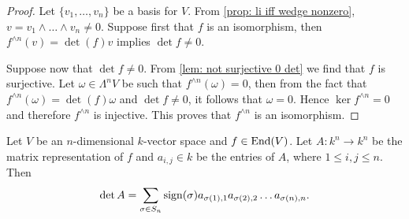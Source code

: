 \begin{proof}
Let \(\{v_1, \dots, v_n\}\) be a basis for \(V\). From \cref{prop: li iff
wedge nonzero}, \(v = v_1 \wedge \dots \wedge v_n \neq 0\).  Suppose first
that \(f\) is an isomorphism, then \(f^{\wedge n}(v) = \det(f) v\) implies
\(\det f \neq 0\).

Suppose now that \(\det f \neq 0\). From \cref{lem: not surjective 0 det} we
find that \(f\) is surjective. Let \(\omega \in \Lambda^n V\) be such that
\(f^{\wedge n}(\omega) = 0\), then from the fact that \(f^{\wedge n}(\omega) =
\det(f) \omega\) and \(\det f \neq 0\), it follows that \(\omega = 0\). Hence
\(\ker f^{\wedge n} = 0\) and therefore \(f^{\wedge n}\) is injective. This
proves that \(f^{\wedge n}\) is an isomorphism.
\end{proof}

\begin{proposition}
\label{prop: matrix det}
Let \(V\) be an \(n\)-dimensional \(k\)-vector space and \(f \in \operatorname{End}(V)\).
Let \(A: k^n \to k^n\) be the matrix representation of \(f\) and \(a_{i, j}
\in k\) be the entries of \(A\), where \(1 \leq i, j \leq n\). Then
\[
  \det A = \sum_{\sigma \in S_n} \operatorname{sign}(\sigma) a_{\sigma(1), 1}
  a_{\sigma(2), 2} \dots a_{\sigma(n), n}.
\]
\end{proposition}

